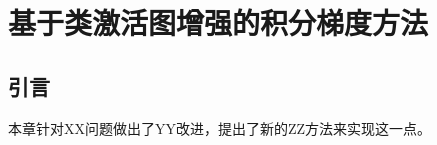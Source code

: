 \chapter{基于类激活图增强的积分梯度方法}
\label{chap4}

\newcommand{\diff}{\mathop{}\!\mathrm{d}} %

\section{引言}

本章针对XX问题做出了YY改进，提出了新的ZZ方法来实现这一点。